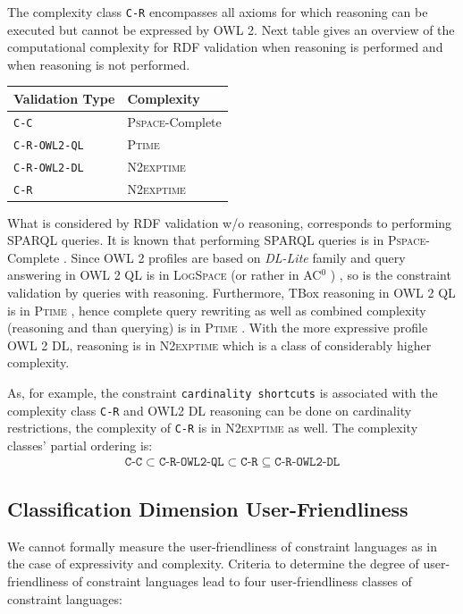 \documentclass{llncs}
\newcommand{\ms}[1]{\texttt{#1}}
\newenvironment{complexity}{
  \begin{tabular}{l|l}
  \hline
  \textbf{Validation Type} & \textbf{Complexity} \\
  \hline

}{
  \hline
  \end{tabular}
  \linebreak
}
\begin{document}
The complexity class \ms{C-R} encompasses all axioms for which reasoning can be executed but cannot be expressed by OWL 2.  
Next table gives an overview of the computational complexity for RDF validation when reasoning is performed and when reasoning is not performed. 
\begin{center}
\begin{complexity}
\ms{C-C} & \textsc{Pspace}-Complete \\
\ms{C-R-OWL2-QL} & \textsc{Ptime} \\
\ms{C-R-OWL2-DL} & \textsc{N2exptime} \\
\ms{C-R} & \textsc{N2exptime} \\
\end{complexity}
\end{center}
What is considered by RDF validation w/o reasoning, corresponds to performing SPARQL queries.  It is known that performing SPARQL queries is in \textsc{Pspace}-Complete \cite{Perez2009}. Since OWL 2 profiles are based on \textit{DL-Lite} family and query answering in OWL 2 QL is in \textsc{LogSpace} (or rather in AC$^0$ ) \cite{Calvanese2007}, so is the constraint validation by queries with  reasoning. Furthermore, TBox reasoning in OWL 2 QL is in \textsc{Ptime} \cite{Calvanese2007}, hence complete query rewriting as well as combined complexity (reasoning and than querying) is in \textsc{Ptime} \cite{Artale2009,Calvanese2007}.  With the more expressive profile OWL 2 DL, reasoning is in \textsc{N2exptime} \cite{owl2profiles2008} which is a class of considerably higher complexity.

As, for example, the constraint \ms{cardinality shortcuts} is associated with the complexity class \ms{C-R} and OWL2 DL reasoning can be done on cardinality restrictions,
the complexity of \ms{C-R} is in \textsc{N2exptime} as well. 
The complexity classes' partial ordering is:
\begin{eqnarray*}
\ms{C-C} \subset \ms{C-R-OWL2-QL} \subset \ms{C-R} \subseteq \ms{C-R-OWL2-DL}
\end{eqnarray*}

\subsection{Classification Dimension User-Friendliness}

We cannot formally measure the user-friendliness of constraint languages as in the case of expressivity and complexity. 
Criteria to determine the degree of user-friendliness of constraint languages lead to four user-friendliness classes of constraint languages:
\end{document}
